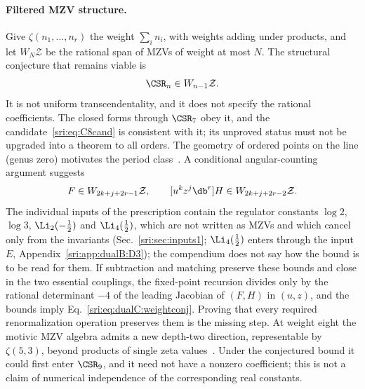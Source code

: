 \paragraph{Filtered MZV structure.} Give $\zeta(n_1,\ldots,n_r)$ the weight $\sum_in_i$, with weights adding under
products, and let $W_N\mathcal Z$ be the rational span of MZVs of weight at most $N$. The structural conjecture that
remains viable is
\begin{equation}
 \CSR_n\in W_{n-1}\mathcal Z .
 \label{sri:eq:dualC:weightconj}
\end{equation}
It is not uniform transcendentality, and it does not specify the rational coefficients. The closed forms through
$\CSR_7$ obey it, and the candidate~\eqref{sri:eq:C8cand} is consistent with it; its unproved status must not be upgraded
into a theorem to all orders. The geometry of ordered points on the line (genus zero) motivates the period
class~\cite{sri:Brown:2009qja,sri:Brown:2011uzk}. A conditional angular-counting argument suggests
\begin{equation}
 [u^kz^j\db^r]F\in W_{2k+j+2r-1}\mathcal Z,\qquad [u^kz^j\db^r]H\in W_{2k+j+2r-2}\mathcal Z .
\end{equation}
The individual inputs of the prescription contain the regulator constants $\log2$, $\log3$, $\Li_2(-\frac12)$ and
$\Li_4(\frac12)$, which are not written as MZVs and which cancel only from the invariants (Sec.~\ref{sri:sec:inputs1}; $\Li_4(\frac12)$ enters through the input $E$,
Appendix~\ref{sri:app:dualB:D3});
the compendium does not say how the bound is to be read for them. If subtraction and matching preserve these bounds and
close in the two essential couplings, the fixed-point recursion divides only by the rational determinant $-4$ of the
leading Jacobian of $(F,H)$ in $(u,z)$, and the bounds imply Eq.~\eqref{sri:eq:dualC:weightconj}. Proving that every
required renormalization operation preserves them is the missing step. At weight eight the motivic MZV algebra admits a
new depth-two direction, representable by $\zeta(5,3)$, beyond products of single zeta values~\cite{sri:Brown:2013depth}.
Under the conjectured bound it could first enter $\CSR_9$, and it need not have a nonzero coefficient; this is not a
claim of numerical independence of the corresponding real constants.

